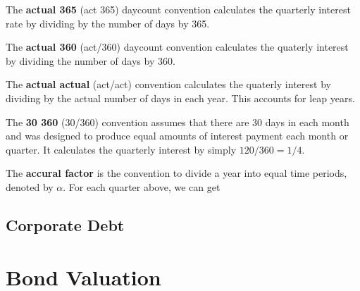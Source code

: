 \documentclass{article}
\begin{document}
      \begin{definition}[Act/365]
        The \textbf{actual 365} (act 365) daycount convention calculates the quarterly interest rate by dividing by the number of days by 365. 
      \end{definition}

      \begin{definition}[Act/360]
        The \textbf{actual 360} (act/360) daycount convention calculates the quaterly interest by dividing the number of days by 360. 
      \end{definition}

      \begin{definition}
        The \textbf{actual actual} (act/act) convention calculates the quaterly interest by dividing by the actual number of days in each year. This accounts for leap years. 
      \end{definition}    

      \begin{definition}[30/360]
        The \textbf{30 360} (30/360) convention assumes that there are 30 days in each month and was designed to produce equal amounts of interest payment each month or quarter. It calculates the quarterly interest by simply $120/360 = 1/4$.
      \end{definition}

      \begin{example}
        The \textbf{accural factor} is the convention to divide a year into equal time periods, denoted by $\alpha$. For each quarter above, we can get 
      \end{example}

  \subsection{Corporate Debt}

\section{Bond Valuation}
\end{document}
